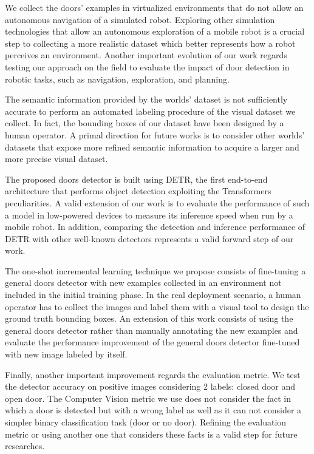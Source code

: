 We collect the doors' examples in virtualized environments that do not allow an autonomous navigation of a simulated robot. Exploring other simulation technologies that allow an autonomous exploration of a mobile robot is a crucial step to collecting a more realistic dataset which better represents how a robot perceives an environment. Another important evolution of our work regards testing our approach on the field to evaluate the impact of door detection in robotic tasks, such as navigation, exploration, and planning.

The semantic information provided by the worlds' dataset is not sufficiently accurate to perform an automated labeling procedure of the visual dataset we collect. In fact, the bounding boxes of our dataset have been designed by a human operator. A primal direction for future works is to consider other worlds' datasets that expose more refined semantic information to acquire a larger and more precise visual dataset.

The proposed doors detector is built using DETR, the first end-to-end architecture that performs object detection exploiting the Transformers peculiarities. A valid extension of our work is to evaluate the performance of such a model in low-powered devices to measure its inference speed when run by a mobile robot. In addition, comparing the detection and inference performance of DETR with other well-known detectors represents a valid forward step of our work. 

The one-shot incremental learning technique we propose consists of fine-tuning a general  doors detector with new examples collected in an environment not included in the initial training phase. In the real deployment scenario, a human operator has to collect the images and label them with a visual tool to design the ground truth bounding boxes. An extension of this work consists of using the general doors detector rather than manually annotating the new examples and evaluate the performance improvement of the general doors detector fine-tuned with new image labeled by itself.

Finally, another important improvement regards the evaluation metric. We test the detector 
accuracy on positive images considering 2 labels: closed door and open door. The Computer Vision metric we use does not consider the fact in which a door is detected but with a wrong label as well as it can not consider a simpler binary classification task (door or no door). Refining the evaluation metric or using another one that considers these facts is a valid step for future researches.



